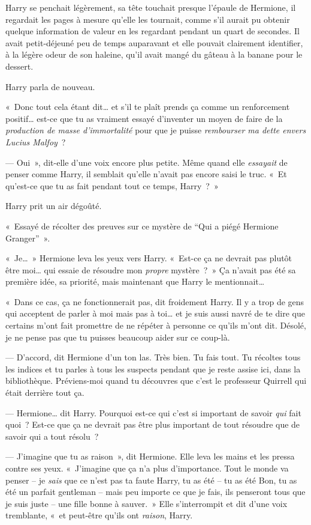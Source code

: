 Harry se penchait légèrement, sa tête touchait presque l'épaule de Hermione, il regardait les pages à mesure qu'elle les tournait, comme s'il aurait pu obtenir quelque information de valeur en les regardant pendant un quart de secondes.
Il avait petit-déjeuné peu de temps auparavant et elle pouvait clairement identifier, à la légère odeur de son haleine, qu'il avait mangé du gâteau à la banane pour le dessert.

Harry parla de nouveau.

«~Donc tout cela étant dit… et s'il te plaît prends ça comme un renforcement positif… est-ce que tu as vraiment essayé d'inventer un moyen de faire de la \emph{production de masse d'immortalité} pour que je puisse \emph{rembourser ma dette envers Lucius Malfoy}~?

--- Oui~», dit-elle d'une voix encore plus petite.
Même quand elle \emph{essayait} de penser comme Harry, il semblait qu'elle n'avait pas encore saisi le truc.
«~Et qu'est-ce que tu as fait pendant tout ce temps, Harry~?~»

Harry prit un air dégoûté.

«~Essayé de récolter des preuves sur ce mystère de “Qui a piégé Hermione Granger”~».

«~Je…~» Hermione leva les yeux vers Harry.
«~Est-ce ça ne devrait pas plutôt être moi… qui essaie de résoudre mon \emph{propre} mystère~?~»
Ça n'avait pas été sa première idée, sa priorité, mais maintenant que Harry le mentionnait…

«~Dans ce cas, ça ne fonctionnerait pas, dit froidement Harry.
Il y a trop de gens qui acceptent de parler à moi mais pas à toi… et je suis aussi navré de te dire que certains m'ont fait promettre de ne répéter à personne ce qu'ils m'ont dit.
Désolé, je ne pense pas que tu puisses beaucoup aider sur ce coup-là.

--- D'accord, dit Hermione d'un ton las.
Très bien.
Tu fais tout.
Tu récoltes tous les indices et tu parles à tous les suspects pendant que je reste assise ici, dans la bibliothèque.
Préviens-moi quand tu découvres que c'est le professeur Quirrell qui était derrière tout ça.

--- Hermione… dit Harry.
Pourquoi est-ce qui c'est si important de savoir \emph{qui} fait quoi~?
Est-ce que ça ne devrait pas être plus important de tout résoudre que de savoir qui a tout résolu~?

--- J'imagine que tu as raison~», dit Hermione.
Elle leva les mains et les pressa contre ses yeux.
«~J'imagine que ça n'a plus d'importance.
Tout le monde va penser -- je \emph{sais} que ce n'est pas ta faute Harry, tu as été -- tu as été Bon, tu as été un parfait gentleman -- mais peu importe ce que je fais, ils penseront tous que je suis juste -- une fille bonne à sauver.~»
Elle s'interrompit et dit d'une voix tremblante, «~et peut-être qu'ils ont \emph{raison}, Harry.

